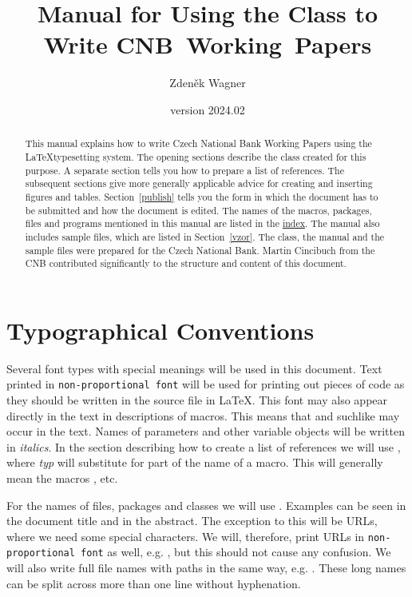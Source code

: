 \documentclass[12pt]{article}
\title{Manual for Using the \fn{cnbwp} Class to Write CNB~Working~Papers}
\author{Zdeněk Wagner}\date{version 2024.02}
\begin{document}
\maketitle

\begin{abstract}\noindent This manual explains how to write Czech National Bank Working Papers
using the  \LaTeX typesetting system. The opening sections describe the  class created
for this purpose. A separate section tells you how to prepare a list of references. The subsequent
sections give more generally applicable advice for creating and inserting figures and tables.
Section~\ref{publish} tells you the form in which the document has to be submitted and how the
document is edited. The names of the macros, packages, files and programs mentioned in this manual
are listed in the \hyperref[index]{index}. The manual also includes sample files, which are listed
in Section~\ref{vzor}. The class, the manual and the sample files were prepared for the Czech
National Bank. Martin Cincibuch from the CNB contributed significantly to the structure and content
of this document.  \end{abstract}

\tableofcontents

\section{Typographical Conventions}\label{typokon} Several font types with special meanings will be
used in this document. Text printed in \texttt{non-proportional font} will be used for printing out
pieces of code as they should be written in the source file in \LaTeX{}. This font may also appear
directly in the text in descriptions of macros. This means that  and suchlike may
occur in the text. Names of parameters and other variable objects will be written in
\textit{italics}. In the section describing how to create a list of references we will use \bibi,
where \textit{typ} will substitute for part of the name of a macro. This will generally mean the
macros ,  etc.

For the names of files, packages and classes we will use . Examples can be seen
in the document title and in the abstract. The exception to this will be URLs, where we need some
special characters. We will, therefore, print URLs in \texttt{non-proportional font} as well, e.g.
, but this should not cause any confusion. We will also
write full file names with paths in the same way, e.g.
. These long names can be split across more
than one line without hyphenation.
	
\end{document}
